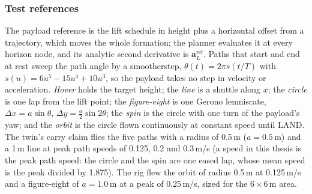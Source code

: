 
\subsubsection{Test references}
\label{sec:trajectories}

The payload reference is the lift schedule in height plus a horizontal offset from a trajectory, which moves the
whole formation; the planner evaluates it at every horizon node, and its analytic second derivative is
$\mathbf{a}_L^{\mathrm{ref}}$. Paths that start and end at rest sweep the path angle by a smootherstep,
$\theta(t) = 2\pi s(t/T)$ with $s(u) = 6u^5 - 15u^4 + 10u^3$, so the payload takes no step in velocity or
acceleration. \emph{Hover} holds the target height; the \emph{line} is a shuttle along $x$; the \emph{circle} is one
lap from the lift point; the \emph{figure-eight} is one Gerono lemniscate, $\Delta x = a\sin\theta$,
$\Delta y = \tfrac{a}{2}\sin 2\theta$; the \emph{spin} is the circle with one turn of the payload's yaw; and the
\emph{orbit} is the circle flown continuously at constant speed until LAND. The twin's carry claim flies the five
paths with a radius of 0.5\,m ($a = 0.5$\,m) and a 1\,m line at peak path speeds of 0.125, 0.2 and 0.3\,m/s (a speed in
this thesis is the peak path speed: the circle and the spin are one eased lap, whose mean speed is the peak divided by
1.875). The rig flew the orbit of radius 0.5\,m at 0.125\,m/s and a figure-eight of $a = 1.0$\,m at a peak of
0.25\,m/s, sized for the 6\,$\times$\,6\,m area.
